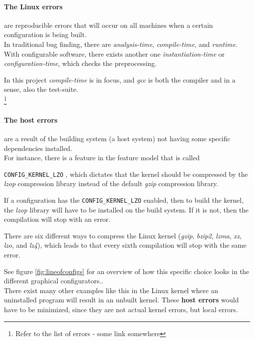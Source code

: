 \documentclass[a4paper,11pt]{report}
\newcommand{\textcode}[1]{
    \fboxsep=1pt
    \texttt{\colorbox{gray!20}{#1}}
}
\begin{document}
    \paragraph{The Linux errors} 
are reproducible errors that will occur on all 
machines when a certain configuration is being built. 
\\

In traditional bug finding, there are \emph{analysis-time}, 
\emph{compile-time}, and \emph{runtime}. With configurable software, there 
exists another one \emph{instantiation-time} or \emph{configuration-time}, 
which checks the preprocessing.
    \cite{IntDatSPL}

In this project \emph{compile-time} is in focus, and \emph{gcc} is both the 
compiler and in a sense, also the test-suite.
\\


    \footnote{Refer to the list of errors - some link somewhere}

    \paragraph{The host errors} 
are a result of the building system (a host system) not having some specific 
dependencies installed.
\\

For instance, there is a feature in the feature model that is called 
\textcode{CONFIG\_KERNEL\_LZO}, which dictates that the kernel should be 
compressed by the \emph{lzop} compression library instead of the default 
\emph{gzip} compression library.

If a configuration has the \textcode{CONFIG\_KERNEL\_LZO} enabled, then to 
build the kernel, the \emph{lzop} library will have to be installed on the 
build system. If it is not, then the compilation will stop with an error.

There are six different ways to compress the Linux kernel (\emph{gzip}, 
\emph{bzip2}, \emph{lzma}, \emph{xz}, \emph{lzo}, and \emph{lz4}),
which leads to that every sixth compilation will stop with the same error.

See figure \ref{fig:lineofconfigs} for an overview of how this specific choice
looks in the different graphical configurators..
\\

There exist many other examples like this in the Linux kernel where an 
uninstalled program will result in an unbuilt kernel. These \textbf{host 
errors} would have to be minimized, since they are not actual kernel errors, 
but local errors. 
\end{document}
